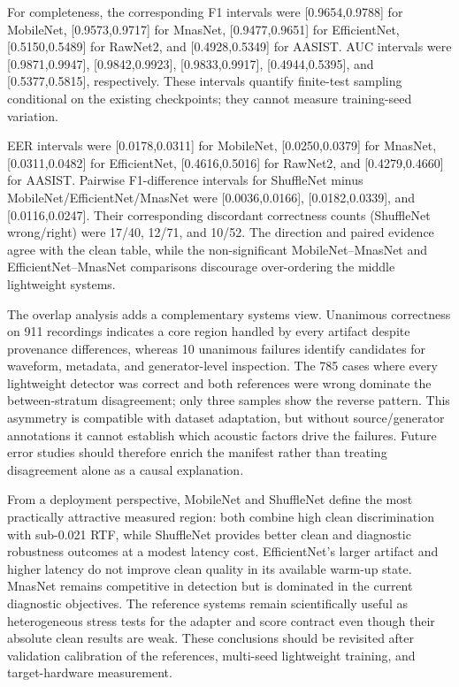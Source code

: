 \documentclass[10pt,journal,onecolumn,a4paper]{IEEEtran}
\begin{document}
For completeness, the corresponding F1 intervals were [0.9654,0.9788] for MobileNet, [0.9573,0.9717] for MnasNet, [0.9477,0.9651] for EfficientNet, [0.5150,0.5489] for RawNet2, and [0.4928,0.5349] for AASIST. AUC intervals were [0.9871,0.9947], [0.9842,0.9923], [0.9833,0.9917], [0.4944,0.5395], and [0.5377,0.5815], respectively. These intervals quantify finite-test sampling conditional on the existing checkpoints; they cannot measure training-seed variation.

EER intervals were [0.0178,0.0311] for MobileNet, [0.0250,0.0379] for MnasNet, [0.0311,0.0482] for EfficientNet, [0.4616,0.5016] for RawNet2, and [0.4279,0.4660] for AASIST. Pairwise F1-difference intervals for ShuffleNet minus MobileNet/EfficientNet/MnasNet were [0.0036,0.0166], [0.0182,0.0339], and [0.0116,0.0247]. Their corresponding discordant correctness counts (ShuffleNet wrong/right) were 17/40, 12/71, and 10/52. The direction and paired evidence agree with the clean table, while the non-significant MobileNet--MnasNet and EfficientNet--MnasNet comparisons discourage over-ordering the middle lightweight systems.

The overlap analysis adds a complementary systems view. Unanimous correctness on 911 recordings indicates a core region handled by every artifact despite provenance differences, whereas 10 unanimous failures identify candidates for waveform, metadata, and generator-level inspection. The 785 cases where every lightweight detector was correct and both references were wrong dominate the between-stratum disagreement; only three samples show the reverse pattern. This asymmetry is compatible with dataset adaptation, but without source/generator annotations it cannot establish which acoustic factors drive the failures. Future error studies should therefore enrich the manifest rather than treating disagreement alone as a causal explanation.

From a deployment perspective, MobileNet and ShuffleNet define the most practically attractive measured region: both combine high clean discrimination with sub-0.021 RTF, while ShuffleNet provides better clean and diagnostic robustness outcomes at a modest latency cost. EfficientNet's larger artifact and higher latency do not improve clean quality in its available warm-up state. MnasNet remains competitive in detection but is dominated in the current diagnostic objectives. The reference systems remain scientifically useful as heterogeneous stress tests for the adapter and score contract even though their absolute clean results are weak. These conclusions should be revisited after validation calibration of the references, multi-seed lightweight training, and target-hardware measurement.
\end{document}
